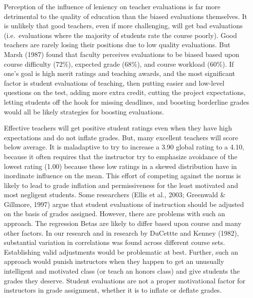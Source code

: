 \documentclass[man]{apa6}
\theoremstyle{definition}
\theoremstyle{definition}
\theoremstyle{definition}
\theoremstyle{remark}
\begin{document}
Perception of the influence of leniency on teacher evaluations is far
more detrimental to the quality of education than the biased evaluations
themselves. It is unlikely that good teachers, even if more challenging,
will get bad evaluations (i.e.~evaluations where the majority of
students rate the course poorly). Good teachers are rarely losing their
positions due to low quality evaluations. But Marsh (1987) found that
faculty perceives evaluations to be biased based upon course difficulty
(72\%), expected grade (68\%), and course workload (60\%). If one's goal
is high merit ratings and teaching awards, and the most significant
factor is student evaluations of teaching, then putting easier and
low-level questions on the test, adding more extra credit, cutting the
project expectations, letting students off the hook for missing
deadlines, and boosting borderline grades would all be likely strategies
for boosting evaluations.

Effective teachers will get positive student ratings even when they have
high expectations and do not inflate grades. But, many excellent
teachers will score below average. It is maladaptive to try to increase
a 3.90 global rating to a 4.10, because it often requires that the
instructor try to emphasize avoidance of the lowest rating (1.00)
because these low ratings in a skewed distribution have in inordinate
influence on the mean. This effort of competing against the norms is
likely to lead to grade inflation and permissiveness for the least
motivated and most negligent students. Some researchers (Ellis et al.,
2003; Greenwald \& Gillmore, 1997) argue that student evaluations of
instruction should be adjusted on the basis of grades assigned. However,
there are problems with such an approach. The regression Betas are
likely to differ based upon course and many other factors. In our
research and in research by DuCettte and Kenney (1982), substantial
variation in correlations was found across different course sets.
Establishing valid adjustments would be problematic at best. Further,
such an approach would punish instructors when they happen to get an
unusually intelligent and motivated class (or teach an honors class) and
give students the grades they deserve. Student evaluations are not a
proper motivational factor for instructors in grade assignment, whether
it is to inflate or deflate grades.
\end{document}
